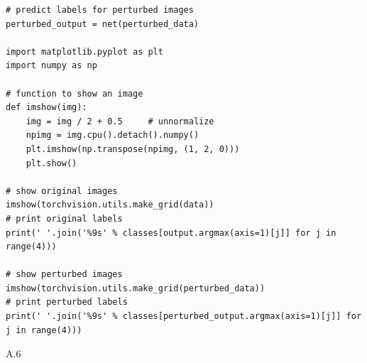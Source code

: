 \documentclass{article}
\begin{document}
\begin{enumerate}
\begin{verbatim}
# predict labels for perturbed images
perturbed_output = net(perturbed_data) 

import matplotlib.pyplot as plt
import numpy as np

# function to show an image
def imshow(img):
    img = img / 2 + 0.5     # unnormalize
    npimg = img.cpu().detach().numpy()
    plt.imshow(np.transpose(npimg, (1, 2, 0)))
    plt.show()

# show original images
imshow(torchvision.utils.make_grid(data))
# print original labels
print(' '.join('%9s' % classes[output.argmax(axis=1)[j]] for j in range(4)))

# show perturbed images
imshow(torchvision.utils.make_grid(perturbed_data))
# print perturbed labels
print(' '.join('%9s' % classes[perturbed_output.argmax(axis=1)[j]] for j in range(4)))
        \end{verbatim}
\end{enumerate}


\newpage

A.6
\end{document}
